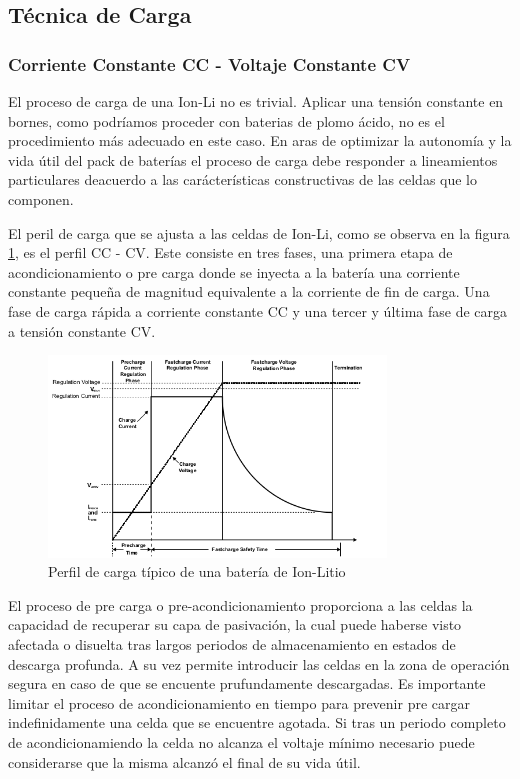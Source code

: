 \documentclass[10pt,a4paper]{article}
\begin{document}
\subsection{Técnica de Carga} 
\subsubsection{Corriente Constante CC - Voltaje Constante CV}

El proceso de carga de una \acrfull{Ion-Li} no es trivial. Aplicar una tensión
constante en  bornes, como podríamos proceder con baterias de plomo ácido, no es
el procedimiento más adecuado en este caso. En aras de optimizar la autonomía y
la vida útil del pack de baterías el proceso de carga debe responder a
lineamientos particulares deacuerdo a las carácterísticas constructivas de las
celdas que lo componen.

El peril de carga que se ajusta a las celdas de \acrshort{Ion-Li}, como se
observa en la figura \ref{fig:char_prof}, es el perfil \acrfull{CC} -
\acrfull{CV}. Este consiste en tres fases, una primera etapa de
acondicionamiento o pre carga donde se inyecta a la batería una corriente
constante pequeña de magnitud equivalente a la corriente de fin de carga. Una
fase de carga rápida a corriente constante \acrshort{CC} y una tercer y última
fase de carga a tensión constante \acrshort{CV}.

\begin{figure}[h!] \centering
    \includegraphics[width=0.8\textwidth]{bat_char/char_profile.png}
    \caption{Perfil de carga típico de una batería de Ion-Litio}
\label{fig:char_prof} \end{figure} \FloatBarrier

El proceso de pre carga o pre-acondicionamiento proporciona a las celdas la
capacidad de recuperar su capa de pasivación, la cual puede haberse visto
afectada o disuelta tras largos periodos de almacenamiento en estados de
descarga profunda. A su vez permite introducir las celdas en la zona de
operación segura en caso de que se encuente prufundamente descargadas.  Es
importante limitar el proceso de acondicionamiento en tiempo para prevenir pre
cargar indefinidamente una celda que se encuentre agotada. Si tras un periodo
completo de acondicionamiendo la celda no alcanza el voltaje mínimo necesario
puede considerarse que la misma alcanzó el final de su vida útil.
\end{document}
